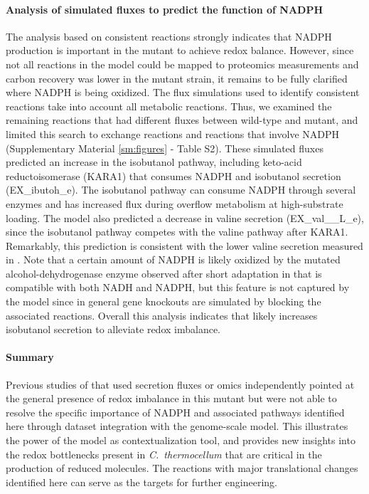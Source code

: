 \paragraph{Analysis of simulated fluxes to predict the function of NADPH}
The analysis based on consistent reactions strongly indicates that NADPH production is important in the mutant to achieve redox balance.
However, since not all reactions in the model could be mapped to proteomics measurements and carbon recovery was lower in the mutant strain,\citep{thompson2015} it remains to be fully clarified where NADPH is being oxidized.
The flux simulations used to identify consistent reactions take into account all metabolic reactions.
Thus, we examined the remaining reactions that had different fluxes between wild-type and mutant, and limited this search to exchange reactions and reactions that involve NADPH (Supplementary Material \ref{sm:figures} - Table S2).
These simulated fluxes predicted an increase in the isobutanol pathway, including keto-acid reductoisomerase (KARA1) that consumes NADPH and isobutanol secretion (EX\_ibutoh\_e).
The isobutanol pathway can consume NADPH through several enzymes\citep{lin2015} and has increased flux during overflow metabolism at high-substrate loading.\citep{holwerda2014,thompson2017}
The model also predicted a decrease in valine secretion (EX\_val\_\_L\_e), since the isobutanol pathway competes with the valine pathway after KARA1.
Remarkably, this prediction is consistent with the lower valine secretion measured in .\citep{biswas2017} %
Note that a certain amount of NADPH is likely oxidized by the mutated alcohol-dehydrogenase enzyme observed after short adaptation in  that is compatible with both NADH and NADPH,\citep{biswas2015} but this feature is not captured by the model since in general gene knockouts are simulated by blocking the associated reactions.
Overall this analysis indicates that  likely increases isobutanol secretion to alleviate redox imbalance.

\paragraph{Summary}
Previous studies of  that used secretion fluxes\citep{thompson2015} or omics\citep{biswas2017} independently pointed at the general presence of redox imbalance in this mutant but were not able to resolve the specific importance of NADPH and associated pathways identified here through dataset integration with the genome-scale model. This illustrates the power of the model as contextualization tool, and provides new insights into the redox bottlenecks present in \textit{C.~thermocellum} that are critical in the production of reduced molecules. The reactions with major translational changes identified here can serve as the targets for further engineering.


